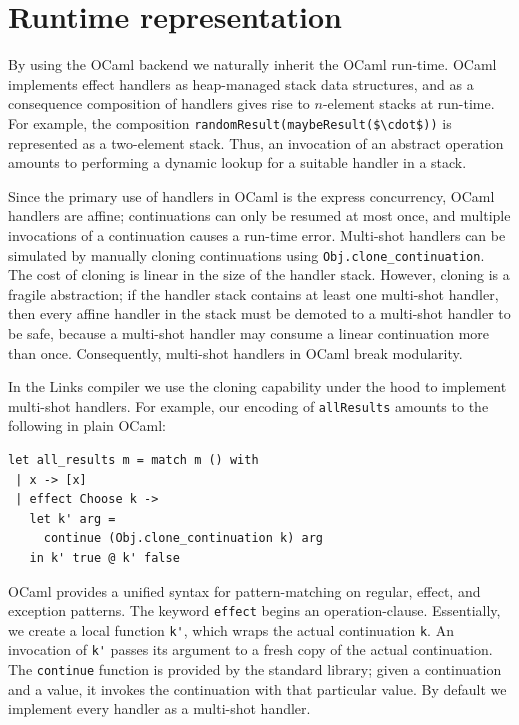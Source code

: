 \documentclass[preprint,numbers]{sigplanconf}
\newcommand{\msgbox}[2]{{%
  \par\noindent\small\color{red}%
  \framebox{\parbox{\dimexpr\linewidth-2\fboxsep-2\fboxrule}{\textbf{#1:} #2}}%
}}
\newcommand{\kc}[1]{\msgbox{KC}{#1}}
\begin{document}

\section{Runtime representation}
By using the OCaml backend we naturally inherit the OCaml
run-time. OCaml implements effect handlers as heap-managed stack data
structures, and as a consequence composition of handlers gives rise to
$n$-element stacks at run-time. For example, the composition
\lstinline[mathescape]!randomResult(maybeResult($\cdot$))! is
represented as a two-element stack. Thus, an invocation of an abstract
operation amounts to performing a dynamic lookup for a suitable
handler in a stack.

Since the primary use of handlers in OCaml is the express concurrency,
OCaml handlers are affine; continuations can only be resumed at most
once, and multiple invocations of a continuation causes a run-time
error. Multi-shot handlers can be simulated by manually cloning
continuations using \lstinline$Obj.clone_continuation$. The cost of
cloning is linear in the size of the handler stack. However, cloning
is a fragile abstraction; if the handler stack contains at least one
multi-shot handler, then every affine handler in the stack must be
demoted to a multi-shot handler to be safe, because a multi-shot
handler may consume a linear continuation more than
once. Consequently, multi-shot handlers in OCaml break modularity.

In the Links compiler we use the cloning capability under the hood to implement
multi-shot handlers. For example, our encoding of \lstinline$allResults$
amounts to the following in plain OCaml:
\begin{lstlisting}[style=ocaml]
let all_results m = match m () with
 | x -> [x]
 | effect Choose k -> 
   let k' arg = 
     continue (Obj.clone_continuation k) arg 
   in k' true @ k' false
\end{lstlisting}
OCaml provides a unified syntax for pattern-matching on regular, effect, and
exception patterns. The keyword \lstinline[style=ocaml]$effect$ begins an
operation-clause. Essentially, we create a local function \lstinline$k'$, which
wraps the actual continuation \lstinline$k$. An invocation of \lstinline$k'$
passes its argument to a fresh copy of the actual continuation. The
\lstinline$continue$ function is provided by the standard library; given a
continuation and a value, it invokes the continuation with that particular
value. By default we implement every handler as a multi-shot handler.
\end{document}
